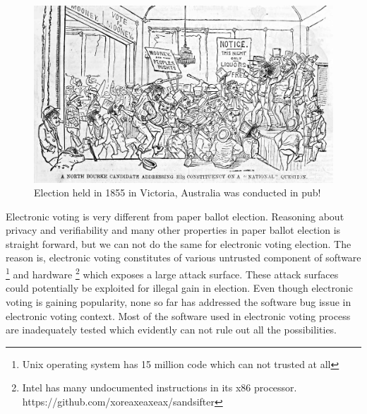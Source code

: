 
 \begin{figure}[htb]
	\begin{center}
	\includegraphics[scale=0.25]{NorthBourke.jpg}
	\caption{Election held in 1855 in Victoria, Australia 
	  was conducted in pub!}
	\end{center}
  \end{figure}   
  
 Electronic voting is very different from paper ballot election. 
 Reasoning 
 about privacy and verifiability and many other properties 
 in paper ballot election 
 is straight forward, but we can not do the same for 
 electronic voting election. The reason is, electronic voting constitutes 
 of various untrusted component of software
 \footnote{Unix operating system has 15 million code which can not 
 trusted at all} and hardware
 \footnote{Intel has many undocumented instructions in its x86 
 processor. https://github.com/xoreaxeaxeax/sandsifter} which 
 exposes a large attack surface. These attack surfaces could 
 potentially be exploited for illegal gain in election. 
 Even though electronic voting is gaining popularity, none so far has 
 addressed the software bug issue in electronic voting context. 
 Most of the software used in electronic voting process are 
 inadequately tested which evidently can not rule out all 
 the possibilities.
  
